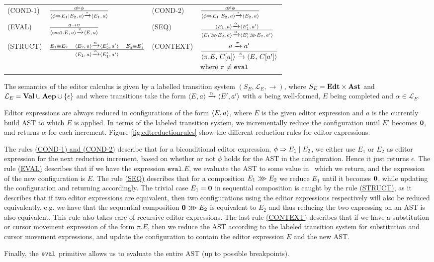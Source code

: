 \begin{figure*}
  \center
  \renewcommand{\arraystretch}{2}
  \begin{tabular}{llll}
    \scriptsize(COND-1)  & $ \frac{a \vDash \phi} {\langle \phi \Rightarrow E_1 \mid E_2,\, a \rangle\xrightarrow[]{\text{$\epsilon$}}\langle E_1,\, a \rangle} $           & \scriptsize(COND-2) & $ \frac{a \nvDash \phi} {\langle \phi \Rightarrow E_1 \mid E_2,\, a \rangle\xrightarrow[]{\text{$\epsilon$}}\langle E_2,\, a \rangle}$ \\
    \scriptsize(EVAL)    & $ \frac{a \to v} {\langle \texttt{eval}.E,\, a \rangle\xrightarrow[]{\text{$v$}}\langle E,\, a \rangle} $              & \scriptsize(SEQ)    & $ \frac{\langle E_1,\, a \rangle\xrightarrow[]{\text{$\alpha$}}\langle E_1',\, a' \rangle} {\langle E_1 \ggg E_2,\, a \rangle\xrightarrow[]{\text{$\alpha$}}\langle E_1' \ggg E_2,\, a' \rangle}$     \\
    \scriptsize(STRUCT)  & $\frac{E_1 \equiv E_2\quad\langle E_2,\, a \rangle\xrightarrow[]{\text{$\alpha$}}\langle E_2',\, a' \rangle \quad E_2' \equiv E_1'} {\langle E_1,\, a \rangle\xrightarrow[]{\text{$\alpha$}}\langle E_1',\, a' \rangle}$              & \scriptsize(CONTEXT)& \scriptsize$\begin{aligned} & \frac{a \xrightarrow[]{\text{$\pi$}} a'} {\langle \pi.E,\, C[a] \rangle\xrightarrow[]{\text{$\pi$}}\langle E,\, C[a'] \rangle} \\ & \text{where } \pi \neq \texttt{eval} \end{aligned}$
  \end{tabular}
  \caption{Editor Expression reduction rules}
  \label{fig:edtreductionrules}
\end{figure*}

The semantics of the editor calculus is given by a labelled transition system
$(S_E, \mathcal{L}_E, \to)$, where $S_E = \textbf{Edt} \times \textbf{Ast}$ and $\mathcal{L}_E
= \textbf{Val} \cup \textbf{Aep} \cup \{\epsilon\}$ and where transitions take the form
$\langle E, a \rangle \xrightarrow[]{\text{$\alpha$}} \langle E', a' \rangle$ with $a$ being
well-formed, $E$ being completed and $\alpha \in \mathcal{L}_E$. 

Editor expressions are always reduced in configurations of the form
$\langle E,a \rangle$, where $E$ is the given editor expression and $a$ is the
currently build AST to which $E$ is applied. In terms of the labeled
transition system, we incrementally reduce the configuration until $E'$ becomes
$\mathbf{0}$, and returns $\alpha$ for each increment. Figure
\ref{fig:edtreductionrules} show the different reduction rules for editor
expressions.

The rules \hyperref[fig:edtreductionrules]{(COND-1) and (COND-2)} describe that
for a biconditional editor expression, $\phi \Rightarrow E_1 \mid E_2$, we either use
$E_1$ or $E_2$ as editor expression for the next reduction increment, based on
whether or not $\phi$ holds for the AST in the configuration. Hence it just
returns $\epsilon$. The rule \hyperref[fig:edtreductionrules]{(EVAL)} describes
that if we have the expression $\texttt{eval}.E$, we evaluate the AST to some
value in \val~which we return, and the expression of the new configuration is
$E$. The rule \hyperref[fig:edtreductionrules]{(SEQ)} describes that for a
composition $E_1 \ggg E_2$ we reduce $E_1$ until it becomes $\mathbf{0}$, while
updating the configuration and returning accordingly. The trivial case $E_1 =
\mathbf{0}$ in sequential composition is caught by the rule
\hyperref[fig:edtreductionrules]{(STRUCT)}, as it describes that if two editor
expressions are equivalent, then two configurations using the editor expressions
respectively will also be reduced equivalently, e.g. we have that the sequential
composition $\mathbf{0} \ggg E_2$ is equivalent to $E_2$ and thus reducing the
two expressing on an AST is also equivalent. This rule also takes care of
recursive editor expressions. The last rule
\hyperref[fig:edtreductionrules]{(CONTEXT)} describes that if we have a
substitution or cursor movement expression of the form $\pi.E$, then we reduce
the AST according to the labeled transition system for substitution and cursor
movement expressions, and update the configuration to contain the editor
expression $E$ and the new AST.

Finally, the $\texttt{eval}$ primitive allows us to evaluate the entire AST
(up to possible breakpoints).

